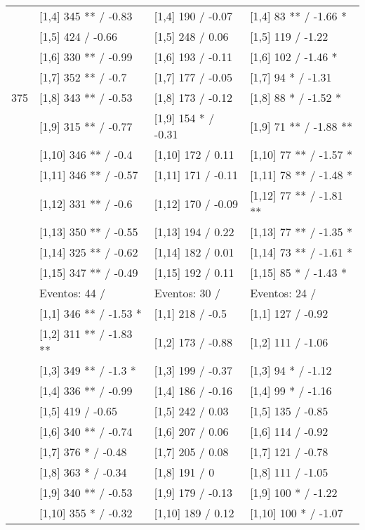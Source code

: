 \begin{table}
\begin{tabular}[t]{llll}
\addlinespace
 & {}[1,4] 345 ** / -0.83 & {}[1,4] 190  / -0.07 & {}[1,4] 83 ** / -1.66 *\\
 & {}[1,5] 424  / -0.66 & {}[1,5] 248  / 0.06 & {}[1,5] 119  / -1.22\\
 & {}[1,6] 330 ** / -0.99 & {}[1,6] 193  / -0.11 & {}[1,6] 102  / -1.46 *\\
 & {}[1,7] 352 ** / -0.7 & {}[1,7] 177  / -0.05 & {}[1,7] 94 * / -1.31\\
375 & {}[1,8] 343 ** / -0.53 & {}[1,8] 173  / -0.12 & {}[1,8] 88 * / -1.52 *\\
\addlinespace
 & {}[1,9] 315 ** / -0.77 & {}[1,9] 154 * / -0.31 & {}[1,9] 71 ** / -1.88 **\\
 & {}[1,10] 346 ** / -0.4 & {}[1,10] 172  / 0.11 & {}[1,10] 77 ** / -1.57 *\\
 & {}[1,11] 346 ** / -0.57 & {}[1,11] 171  / -0.11 & {}[1,11] 78 ** / -1.48 *\\
 & {}[1,12] 331 ** / -0.6 & {}[1,12] 170  / -0.09 & {}[1,12] 77 ** / -1.81 **\\
 & {}[1,13] 350 ** / -0.55 & {}[1,13] 194  / 0.22 & {}[1,13] 77 ** / -1.35 *\\
\addlinespace
 & {}[1,14] 325 ** / -0.62 & {}[1,14] 182  / 0.01 & {}[1,14] 73 ** / -1.61 *\\
 & {}[1,15] 347 ** / -0.49 & {}[1,15] 192  / 0.11 & {}[1,15] 85 * / -1.43 *\\
 & Eventos:  44 / & Eventos:  30 / & Eventos:  24 /\\
 & {}[1,1] 346 ** / -1.53 * & {}[1,1] 218  / -0.5 & {}[1,1] 127  / -0.92\\
 & {}[1,2] 311 ** / -1.83 ** & {}[1,2] 173  / -0.88 & {}[1,2] 111  / -1.06\\
\addlinespace
 & {}[1,3] 349 ** / -1.3 * & {}[1,3] 199  / -0.37 & {}[1,3] 94 * / -1.12\\
 & {}[1,4] 336 ** / -0.99 & {}[1,4] 186  / -0.16 & {}[1,4] 99 * / -1.16\\
 & {}[1,5] 419  / -0.65 & {}[1,5] 242  / 0.03 & {}[1,5] 135  / -0.85\\
 & {}[1,6] 340 ** / -0.74 & {}[1,6] 207  / 0.06 & {}[1,6] 114  / -0.92\\
 & {}[1,7] 376 * / -0.48 & {}[1,7] 205  / 0.08 & {}[1,7] 121  / -0.78\\
\addlinespace
500 & {}[1,8] 363 * / -0.34 & {}[1,8] 191  / 0 & {}[1,8] 111  / -1.05\\
 & {}[1,9] 340 ** / -0.53 & {}[1,9] 179  / -0.13 & {}[1,9] 100 * / -1.22\\
 & {}[1,10] 355 * / -0.32 & {}[1,10] 189  / 0.12 & {}[1,10] 100 * / -1.07\\

\end{tabular}
\end{table}
